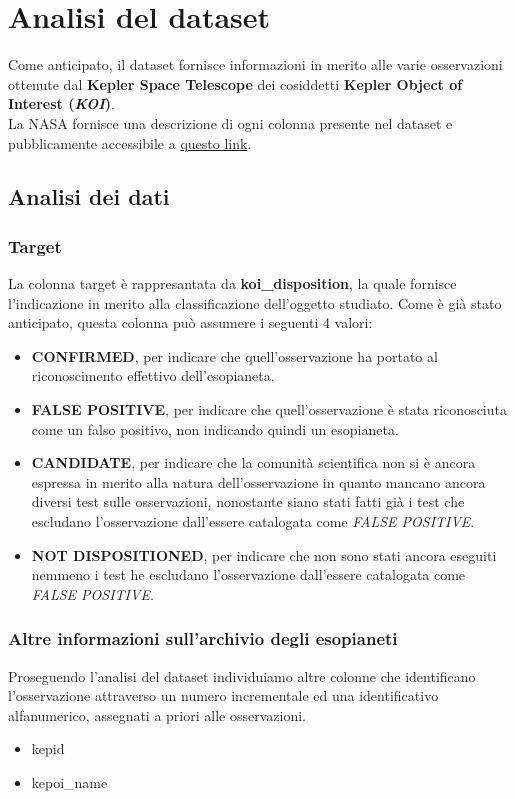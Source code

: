 \chapter{Analisi del dataset}
Come anticipato, il dataset fornisce informazioni in merito alle varie 
osservazioni ottenute dal \textbf{Kepler Space Telescope} dei cosiddetti
\textbf{Kepler Object of Interest (\textit{KOI})}.\\

La NASA fornisce una descrizione di ogni colonna presente nel dataset e 
pubblicamente accessibile a 
\href{https://exoplanetarchive.ipac.caltech.edu/docs/API_kepcandidate_columns.html}{questo link}.

\section{Analisi dei dati}

\subsection{Target}

La colonna target è rappresantata da \textbf{koi\_disposition}, la quale 
fornisce l'indicazione in merito alla classificazione dell'oggetto studiato.
Come è già stato anticipato, questa colonna può assumere i seguenti 4 valori: 
\begin{itemize}
    \item \textbf{CONFIRMED}, per indicare che quell'osservazione ha portato al 
    riconoscimento effettivo dell'esopianeta.
    \item \textbf{FALSE POSITIVE}, per indicare che quell'osservazione è stata 
    riconosciuta come un falso positivo, non indicando quindi un esopianeta.
    \item \textbf{CANDIDATE}, per indicare che la comunità scientifica non si 
    è ancora espressa in merito alla natura dell'osservazione in quanto mancano
    ancora diversi test sulle osservazioni, nonostante siano stati fatti già
    i test che escludano l'osservazione dall'essere catalogata come 
    \textit{FALSE POSITIVE}.
    \item \textbf{NOT DISPOSITIONED}, per indicare che non sono stati ancora 
    eseguiti nemmeno i test he escludano l'osservazione dall'essere catalogata 
    come \textit{FALSE POSITIVE}.
\end{itemize}

\subsection{Altre informazioni sull'archivio degli esopianeti}
Proseguendo l'analisi del dataset individuiamo altre colonne 
che identificano l'osservazione attraverso un numero incrementale ed una 
identificativo alfanumerico, assegnati a priori alle osservazioni. 
\begin{itemize}
    \item kepid
    \item kepoi\_name
\end{itemize}

